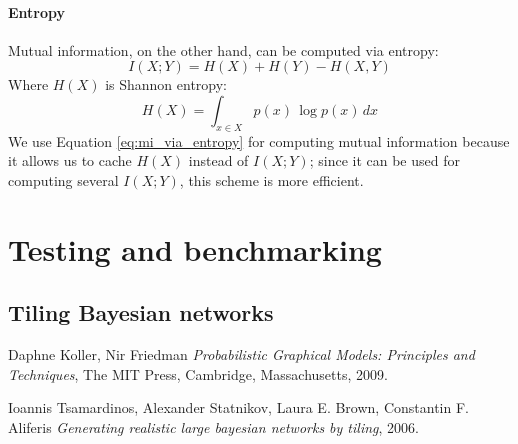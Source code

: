 \documentclass{article}
\begin{document}
\paragraph{Entropy} 
Mutual information, on the other hand, can be computed via entropy:
\begin{equation}
\label{eq:mi_via_entropy}
I(X; Y) = H(X) + H(Y) - H(X, Y)
\end{equation}
Where $H(X)$ is Shannon entropy:
\begin{equation}
H(X) = \int_{x \in X}{p(x)\,\log p(x)\,dx}
\end{equation}
We use Equation \ref{eq:mi_via_entropy} for computing mutual information because it allows us to cache $H(X)$ instead of $I(X; Y)$; since it can be used for computing several $I(X; Y)$, this scheme is more efficient.

\section{Testing and benchmarking}
\subsection{Tiling Bayesian networks \cite{Tsamardinos2006}}

\begin{thebibliography}{9}
	
	Daphne Koller, Nir Friedman
	\emph{Probabilistic Graphical Models: Principles and Techniques},
	The MIT Press, Cambridge, Massachusetts,
	2009.
	
	Ioannis Tsamardinos, Alexander Statnikov, Laura E. Brown, Constantin F. Aliferis
	\emph{Generating realistic large bayesian networks by tiling},
	2006.
	
\end{thebibliography}
\end{document}
